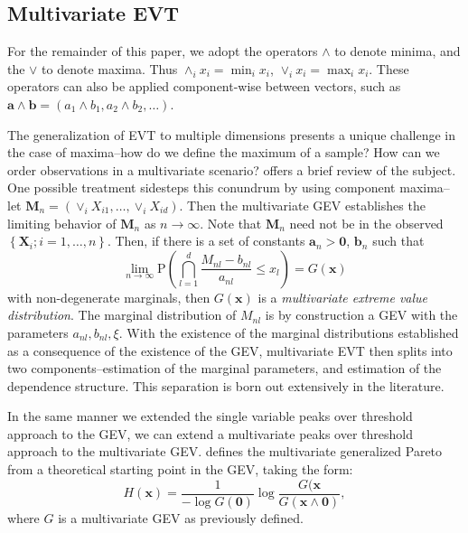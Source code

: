\subsection{Multivariate EVT}
\label{subsec:mvevt}
For the remainder of this paper, we adopt the operators $\wedge$ to denote minima, and the $\vee$
  to denote maxima.  Thus $\wedge_i x_i = \min_i x_i$, $\vee_i x_i = \max_i x_i$.  These operators can
  also be applied component-wise between vectors, such as $\bm{a}\wedge\bm{b} = (a_1\wedge b_1, a_2\wedge b_2,\ldots)$.

The generalization of EVT to multiple dimensions presents a unique challenge in the case of maxima--how
  do we define the maximum of a sample?  How can we order observations in a multivariate scenario?
  \cite{rootzen2006} offers a brief review of the subject.  One possible treatment sidesteps this
  conundrum by using component maxima--let $\bm{M}_n = \left(\vee_i X_{i1},\ldots,\vee_i X_{id}\right)$.
  Then the multivariate GEV establishes the limiting behavior of $\bm{M}_n$ as $n\to\infty$.  Note
  that $\bm{M}_n$ need not be in the observed $\left\lbrace\bm{X}_i; i = 1,\ldots,n\right\rbrace$.
  Then, if there is a set of constants $\bm{a}_n > \bm{0}$, $\bm{b}_n$ such that
  \begin{equation*}
    \lim\limits_{n\to\infty}\text{P}\left(\bigcap_{l = 1}^d \frac{M_{nl} - b_{nl}}{a_{nl}} \leq x_l\right) = G(\bm{x})
  \end{equation*}
  with non-degenerate marginals, then $G(\bm{x})$ is a \emph{multivariate extreme value distribution}.
  The marginal distribution of $M_{nl}$ is by construction a GEV with the parameters $a_{nl}, b_{nl}, \xi$.
  With the existence of the marginal distributions established as a consequence of the existence of the
  GEV, multivariate EVT then splits into two components--estimation of the marginal parameters, and
  estimation of the dependence structure.  This separation is born out extensively in the literature.

In the same manner we extended the single variable peaks over threshold approach to the GEV, we can
  extend a multivariate peaks over threshold approach to the multivariate GEV.  \citet{rootzen2006}
  defines the multivariate generalized Pareto from a theoretical starting point in the GEV, taking
  the form:
  \begin{equation*}
    H(\bm{x}) = \frac{1}{-\log G(\bm{0})}\log\frac{G(\bm{x}}{G(\bm{x}\wedge \bm{0})},
  \end{equation*}
  where $G$ is a multivariate GEV as previously defined.

